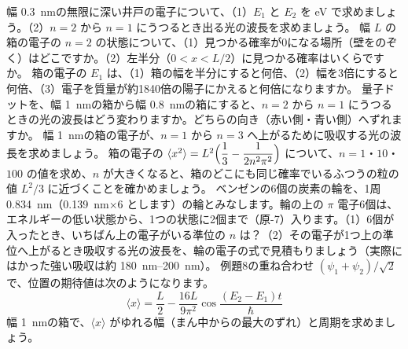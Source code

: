 \bkendproblems
{}
\bkproblem 幅 \qty{0.3}{nm}の無限に深い井戸の電子について、（1）$E_1$ と $E_2$ を eV で求めましょう。（2）$n=2$ から $n=1$ にうつるとき出る光の波長を求めましょう。
\bkproblem 幅 $L$ の箱の電子の $n=2$ の状態について、（1）見つかる確率が0になる場所（壁をのぞく）はどこですか。（2）左半分（$0<x<L/2$）に見つかる確率はいくらですか。
\bkproblem 箱の電子の $E_1$ は、（1）箱の幅を半分にすると何倍、（2）幅を3倍にすると何倍、（3）電子を質量が約1840倍の陽子にかえると何倍になりますか。
\bkproblem 量子ドットを、幅 \qty{1}{nm}の箱から幅 \qty{0.8}{nm}の箱にすると、$n=2$ から $n=1$ にうつるときの光の波長はどう変わりますか。どちらの向き（赤い側・青い側）へずれますか。
\bkproblem 幅 \qty{1}{nm}の箱の電子が、$n=1$ から $n=3$ へ上がるために吸収する光の波長を求めましょう。
\bkproblem 箱の電子の $\langle x^2\rangle=L^2\Bigl(\dfrac13-\dfrac{1}{2n^2\pi^2}\Bigr)$ について、$n=1$・$10$・$100$ の値を求め、$n$ が大きくなると、箱のどこにも同じ確率でいるふつうの粒の値 $L^2/3$ に近づくことを確かめましょう。
\bkproblem ベンゼンの6個の炭素の輪を、1周 \qty{0.834}{nm}（\qty{0.139}{nm}×6 とします）の輪とみなします。輪の上の $\pi$ 電子6個は、エネルギーの低い状態から、1つの状態に2個まで（原-7）入ります。（1）6個が入ったとき、いちばん上の電子がいる準位の $n$ は？（2）その電子が1つ上の準位へ上がるとき吸収する光の波長を、輪の電子の式で見積もりましょう（実際にはかった強い吸収は約 \qtyrange{180}{200}{nm}）。
\bkproblem 例題8の重ね合わせ $(\psi_1+\psi_2)/\sqrt2$ で、位置の期待値は次のようになります。
\[\langle x\rangle=\frac L2-\frac{16L}{9\pi^2}\cos\frac{(E_2-E_1)t}{\hbar}\]
幅 \qty{1}{nm}の箱で、$\langle x\rangle$ がゆれる幅（まん中からの最大のずれ）と周期を求めましょう。

